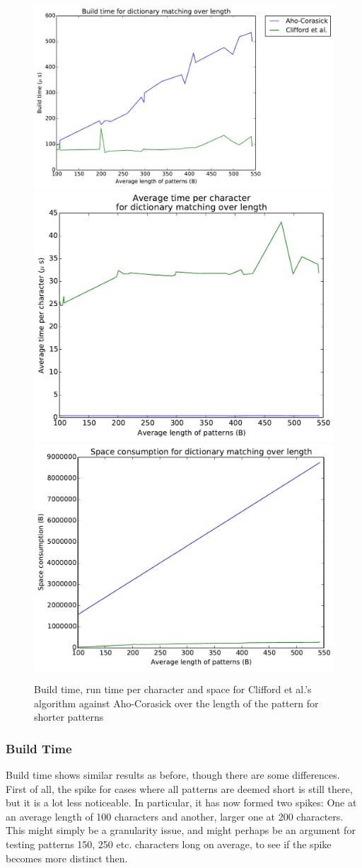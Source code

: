 \documentclass[ %
                    author={Dominic Joseph Moylett},
                    degree={MEng},
                     title={Dictionary Matching with Fingerprints},
                  subtitle={An Empirical Analysis},
                      type={research},
                      year={2015} ]{dissertation}
\begin{document}
\begin{figure}[t]
\begin{center}
  \includegraphics[width=0.7\linewidth]{build_length_200_1000}\\
  \includegraphics[width=0.5\linewidth]{time_length_200_1000}\includegraphics[width=0.5\linewidth]{size_length_200_1000}
\end{center}
\caption{Build time, run time per character and space for Clifford et al.'s algorithm against Aho-Corasick over the length of the pattern for shorter patterns}
\label{fig:short-pattern-results}
\end{figure}

\subsubsection{Build Time}

Build time shows similar results as before, though there are some differences. First of all, the spike for cases where all patterns are deemed short is still there, but it is a lot less noticeable. In particular, it has now formed two spikes: One at an average length of 100 characters and another, larger one at 200 characters. This might simply be a granularity issue, and might perhaps be an argument for testing patterns 150, 250 etc. characters long on average, to see if the spike becomes more distinct then.
\end{document}

